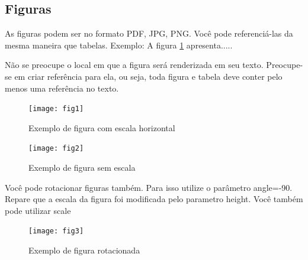 \documentclass[	DIV=calc,%
							paper=a4,%
							fontsize=12pt,%
							onecolumn]{scrartcl}	 					%
\begin{document}
\subsection{Figuras}

As figuras podem ser no formato PDF, JPG, PNG. Você pode referenciá-las da mesma maneira que tabelas. Exemplo: A figura \ref{fig1} apresenta.....

Não se preocupe o local em que a figura será renderizada em seu texto. Preocupe-se em criar referência para ela, ou seja, toda figura e tabela deve conter pelo menos uma referência no texto.

\begin{figure}
\centering
\texttt{[image: fig1]}
\caption{Exemplo de figura com escala horizontal}
\label{fig1}
\end{figure}


\begin{figure}
	\centering
	\texttt{[image: fig2]}
	\caption{Exemplo de figura sem escala}
	\label{fig2}
\end{figure}

Você pode rotacionar figuras também. Para isso utilize o parâmetro angle=-90. Repare que a escala da figura foi modificada pelo parametro height. Você também pode utilizar scale

\begin{figure}
	\centering
	\texttt{[image: fig3]}
	\caption{Exemplo de figura rotacionada}
	\label{fig3}
\end{figure}


\end{document}
